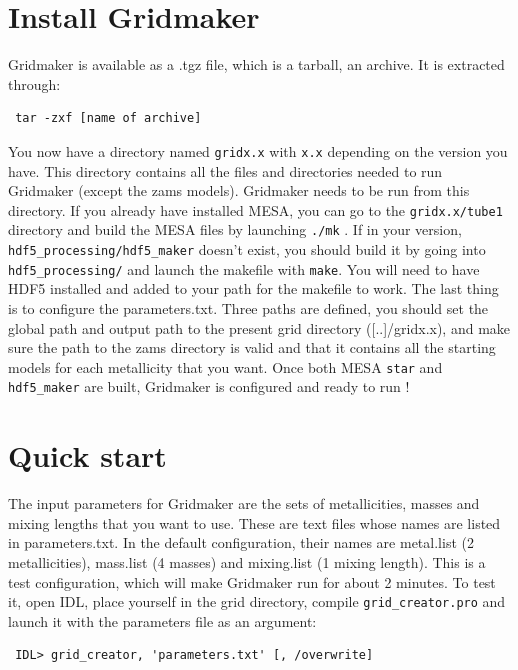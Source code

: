 \documentclass{report}
\begin{document}
\section{Install Gridmaker}

Gridmaker is available as a .tgz file, which is a tarball, an archive. It is extracted through:
\begin{verbatim} tar -zxf [name of archive]
\end{verbatim}
You now have a directory named \verb+gridx.x+ with \verb+x.x+ depending on the version you have. This directory contains all the files and directories needed to run Gridmaker (except the zams models). Gridmaker needs to be run from this directory. If you already have installed MESA, you can go 
to the \verb+gridx.x/tube1+ directory and build the MESA files by launching \verb+./mk+ . If in your version, \verb+hdf5_processing/hdf5_maker+ 
doesn't exist, you should build it by going into \verb+hdf5_processing/+ and launch the makefile with \verb+make+. You will need to have HDF5 
installed and added to your path for the makefile to work. The last thing is to configure the parameters.txt. Three paths are defined, you should 
set the global path and output path to the present grid directory ([..]/gridx.x), and make sure the path to the zams directory is valid and that it contains all the starting models for each metallicity that you want. Once both MESA \verb+star+ and \verb+hdf5_maker+ are built, Gridmaker is configured and ready to run ! 

\section{Quick start}

The input parameters for Gridmaker are the sets of metallicities, masses and mixing lengths that you want to use. These are text files whose names are listed in parameters.txt. In the default configuration, their names are metal.list (2 metallicities), mass.list (4 masses) and mixing.list (1 mixing length). This is a test configuration, which will make Gridmaker run for about 2 minutes. To test it, open IDL, place yourself in the grid directory, compile \verb+grid_creator.pro+ and launch it with the parameters file as an argument:

\begin{verbatim} IDL> grid_creator, 'parameters.txt' [, /overwrite]\end{verbatim}
\end{document}
